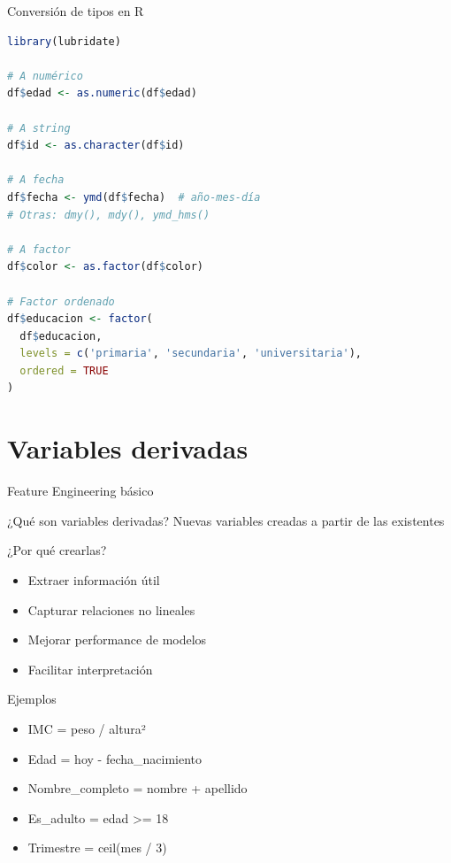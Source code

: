 \documentclass[aspectratio=169]{beamer}
\begin{document}
\begin{frame}[fragile]{Conversión de tipos en R}
\begin{lstlisting}[language=R]
library(lubridate)

# A numérico
df$edad <- as.numeric(df$edad)

# A string
df$id <- as.character(df$id)

# A fecha
df$fecha <- ymd(df$fecha)  # año-mes-día
# Otras: dmy(), mdy(), ymd_hms()

# A factor
df$color <- as.factor(df$color)

# Factor ordenado
df$educacion <- factor(
  df$educacion,
  levels = c('primaria', 'secundaria', 'universitaria'),
  ordered = TRUE
)
\end{lstlisting}
\end{frame}

\section{Variables derivadas}

\begin{frame}{Feature Engineering básico}
\begin{block}{¿Qué son variables derivadas?}
Nuevas variables creadas a partir de las existentes
\end{block}

\begin{block}{¿Por qué crearlas?}
\begin{itemize}
    \item Extraer información útil
    \item Capturar relaciones no lineales
    \item Mejorar performance de modelos
    \item Facilitar interpretación
\end{itemize}
\end{block}

\pause

\begin{exampleblock}{Ejemplos}
\begin{itemize}
    \item IMC = peso / altura²
    \item Edad = hoy - fecha\_nacimiento
    \item Nombre\_completo = nombre + apellido
    \item Es\_adulto = edad >= 18
    \item Trimestre = ceil(mes / 3)
\end{itemize}
\end{exampleblock}
\end{frame}
\end{document}
